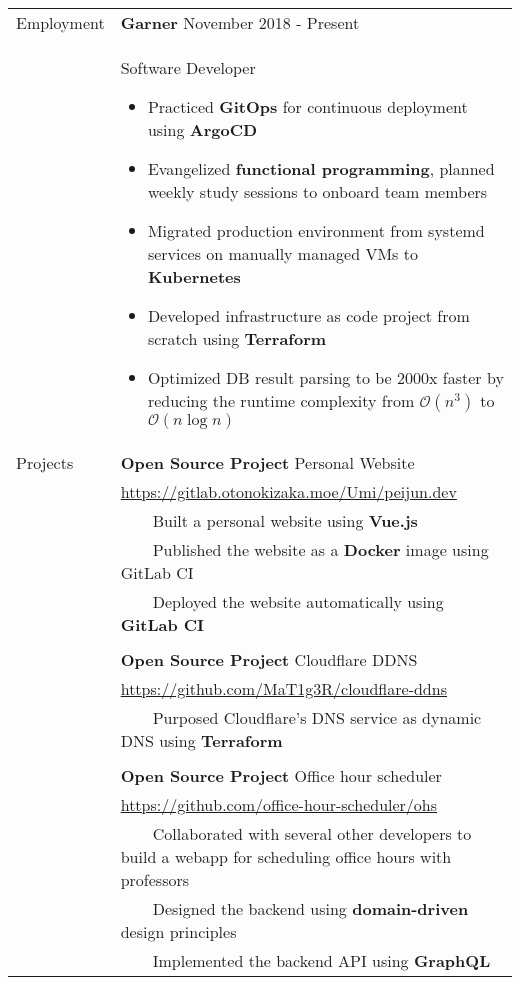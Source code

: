 \documentclass[letterpaper,12pt,oneside]{article}
\newcommand{\tabitem}{~~\llap{\textbullet}~~}
\newcommand{\smallurl}[1]{\small{\url{#1}}}
\begin{document}
\begin{longtable}{@{} l p{14cm}}
\pagebreak
\Large{Employment}
& \large{\textbf{Garner}} November 2018 - Present\\
& Software Developer
\begin{itemize}[leftmargin=*,topsep=0pt,partopsep=0pt]
      \setlength\itemsep{0em}
      \item Practiced \textbf{GitOps} for continuous deployment using \textbf{ArgoCD}
      \item Evangelized \textbf{functional programming}, planned weekly study sessions to onboard team members
      \item Migrated production environment from systemd services on manually managed VMs to \textbf{Kubernetes}
      \item Developed infrastructure as code project from scratch using \textbf{Terraform}
      \item Optimized DB result parsing to be 2000x faster by reducing the runtime complexity from $\mathcal{O}(n^3)$ to $\mathcal{O}(n\log{}n)$
\end{itemize} \\
\Large{Projects}
& \textbf{Open Source Project} Personal Website  \\
& \smallurl{https://gitlab.otonokizaka.moe/Umi/peijun.dev} \\
& \tabitem Built a personal website using \textbf{Vue.js} \\
& \tabitem Published the website as a \textbf{Docker} image using GitLab CI \\
& \tabitem Deployed the website automatically using \textbf{GitLab CI} \\
& \\
& \textbf{Open Source Project} Cloudflare DDNS \\
& \smallurl{https://github.com/MaT1g3R/cloudflare-ddns} \\
& \tabitem Purposed Cloudflare's DNS service as dynamic DNS using \textbf{Terraform} \\
& \\
& \textbf{Open Source Project} Office hour scheduler \\
& \smallurl{https://github.com/office-hour-scheduler/ohs} \\
& \tabitem Collaborated with several other developers to build a webapp for scheduling office hours with professors \\
& \tabitem Designed the backend using \textbf{domain-driven} design principles \\
& \tabitem Implemented the backend API using \textbf{GraphQL} \\

\end{longtable}
\end{document}
